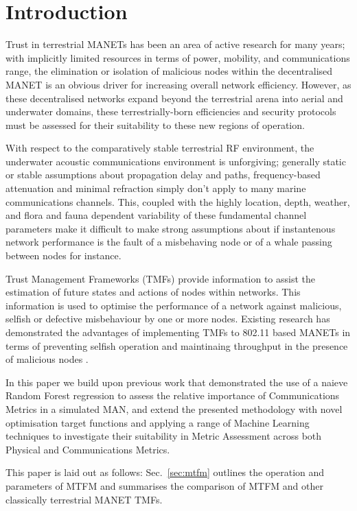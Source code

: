 \documentclass[conference]{IEEEtran}
\begin{document}
\section{Introduction}

Trust in terrestrial MANETs has been an area of active research for many years; with implicitly limited resources in terms of power, mobility, and communications range, the elimination or isolation of malicious nodes within the decentralised MANET is an obvious driver for increasing overall network efficiency. 
However, as these decentralised networks expand beyond the terrestrial arena into aerial and underwater domains, these terrestrially-born efficiencies and security protocols must be assessed for their suitability to these new regions of operation.

With respect to the comparatively stable terrestrial RF environment, the underwater acoustic communications environment is unforgiving; generally static or stable assumptions about propagation delay and paths, frequency-based attenuation and minimal refraction simply don't apply to many marine communications channels.
This, coupled with the highly location, depth, weather, and flora and fauna dependent variability of these fundamental channel parameters make it difficult to make strong assumptions about if instantenous network performance is the fault of a misbehaving node or of a whale passing between nodes for instance.

Trust Management Frameworks (TMFs) provide information to assist the estimation of future states and actions of nodes within networks. 
This information is used to optimise the performance of a network against malicious, selfish or defective misbehaviour by one or more nodes. 
Existing research has demonstrated the advantages of implementing TMFs to 802.11 based MANETs in terms of preventing selfish operation and maintinaing throughput in the presence of malicious nodes \cite{Li2007,Buchegger2002}.

In this paper we build upon previous work \cite{Bolster2015} that demonstrated the use of a naieve Random Forest regression \cite{Breiman2001} to assess the relative importance of Communications Metrics in a simulated MAN, and extend the presented methodology with novel optimisation target functions and applying a range of Machine Learning techniques to investigate their suitability in Metric Assessment across both Physical and Communications Metrics.

This paper is laid out as follows: Sec.~\ref{sec:mtfm} outlines the operation and parameters of MTFM and summarises the comparison of MTFM and other classically terrestrial MANET TMFs.
\end{document}
